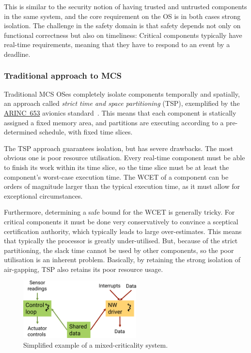 \documentclass[english,a4paper,12pt\ifDraft,draft\fi]{report}
\newcommand{\SSSect}[1]{\subsubsection*{#1}}
\newcommand{\SSSect}[1]{\subsection*{#1}}
\begin{document}
  This is similar to the security notion of having trusted and
  untrusted components in the same system, and the core requirement on
  the OS is in both cases strong isolation. The challenge in the
  safety domain is that safety depends not only on functional
  correctness but also on timeliness: Critical components typically
  have real-time requirements, meaning that they have to respond to an
  event by a deadline.

  \SSSect{Traditional approach to MCS}

  Traditional MCS OSes completely isolate components temporally and
  spatially, an approach called \emph{strict time and space
    partitioning} (TSP), exemplified by the
  \href{https://en.wikipedia.org/wiki/ARINC_653}{ARINC~653} avionics
  standard~\citep{ARINC653}. This means that each component is
  statically assigned a fixed memory area, and partitions are
  executing according to a pre-determined schedule, with fixed time
  slices.

  The TSP approach guarantees isolation, but has severe drawbacks. The
  most obvious one is poor resource utilisation. Every real-time component must
  be able to finish its work within its time slice, so the time slice
  must be at least the component's worst-case execution time.
  The WCET of a component can be orders of magnitude larger
  than the typical execution time, as it must allow for exceptional circumstances.

  Furthermore, determining a safe bound for the WCET is generally
  tricky. For critical components it must be done very conservatively
  to convince a sceptical certification authority, which typically
  leads to large over-estimates. This means that typically the
  processor is greatly under-utilised. But, because of the strict
  partitioning, the slack time cannot be used by other components, so
  the poor utilisation is an inherent problem. Basically, by retaining
  the strong isolation of air-gapping, TSP also retains its poor
  resource usage.

  \begin{figure}[b]
    \centering
    \includegraphics[width=0.55\textwidth]{mcs}
    \caption{Simplified example of a mixed-criticality system.}
    \label{f:mcs}
  \end{figure}
\end{document}
